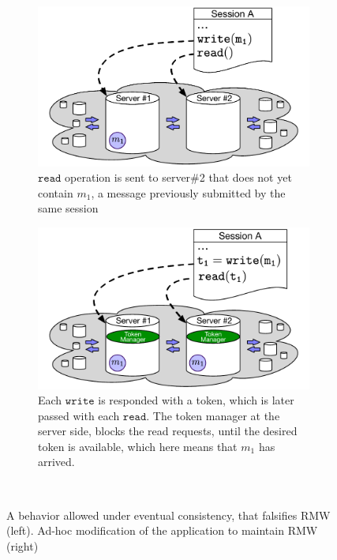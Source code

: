 \begin{figure}
\centering
\begin{subfigure}[t]{0.48\textwidth}
\begin{center}
\includegraphics[scale=0.45]{Figures/System_example.pdf}
\end{center}
\vspace{0 mm}
\caption{ $\mathtt{read}$ operation is sent to server\#2 that does not yet
contain $m_1$, a message previously submitted by the same session}
\end{subfigure}\quad
\begin{subfigure}[t]{0.48\textwidth}
\includegraphics[scale=0.45]{Figures/System_example_adhoc.pdf}
\caption{Each $\mathtt{write}$ is responded with a token, which is later
passed with each $\mathtt{read}$. The token manager at the server side,
blocks the read requests, until the desired token is available, which
here means that $m_1$ has arrived. }
\end{subfigure}
\\ \hrulefill 
\caption {A behavior allowed under eventual consistency, that
falsifies RMW (left).  Ad-hoc modification of the application to
maintain RMW (right)}


\end{figure}


